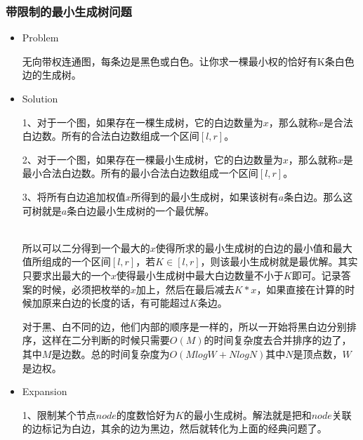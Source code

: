\subsubsection{带限制的最小生成树问题}
	\begin{itemize}
		\item Problem \par
			无向带权连通图，每条边是黑色或白色。让你求一棵最小权的恰好有K条白色边的生成树。
		\item Solution \par
			1、对于一个图，如果存在一棵生成树，它的白边数量为$x$，那么就称$x$是合法白边数。所有的合法白边数组成一个区间$[l,r]$。\par
			2、对于一个图，如果存在一棵最小生成树，它的白边数量为$x$，那么就称$x$是最小合法白边数。所有的最小合法白边数组成一个区间$[l,r]$。\par
			3、将所有白边追加权值$x$所得到的最小生成树，如果该树有$a$条白边。那么这可树就是$a$条白边最小生成树的一个最优解。

			~\\
			所以可以二分得到一个最大的$x$使得所求的最小生成树的白边的最小值和最大值所组成的一个区间$[l,r]$，若$K\in [l,r]$，则该最小生成树就是最优解。其实只要求出最大的一个$x$使得最小生成树中最大白边数量不小于$K$即可。记录答案的时候，必须把枚举的$x$加上，然后在最后减去$K*x$，如果直接在计算的时候加原来白边的长度的话，有可能超过$K$条边。\par
			对于黑、白不同的边，他们内部的顺序是一样的，所以一开始将黑白边分别排序，这样在二分判断的时候只需要$O(M)$的时间复杂度去合并排序的边了，其中$M$是边数。总的时间复杂度为$O(MlogW+NlogN)$其中$N$是顶点数，$W$是边权。

		\item Expansion \par
			1、限制某个节点$node$的度数恰好为$K$的最小生成树。解法就是把和$node$关联的边标记为白边，其余的边为黑边，然后就转化为上面的经典问题了。
	\end{itemize}

